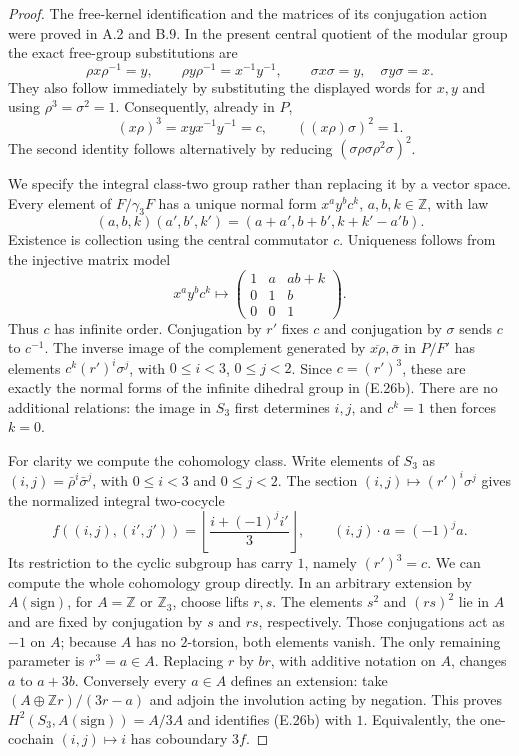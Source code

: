 \begin{proof}
The free-kernel identification and the matrices of its conjugation
action were proved in A.2 and B.9. In the present central quotient
of the modular group the exact free-group substitutions are
\[
 \rho x\rho^{-1}=y,\qquad
 \rho y\rho^{-1}=x^{-1}y^{-1},\qquad
 \sigma x\sigma=y,\quad\sigma y\sigma=x.                      \tag{E.26e}
\]
They also follow immediately by substituting the displayed words
for $x,y$ and using $\rho^3=\sigma^2=1$.
Consequently, already in $P$,
\[
 (x\rho)^3=xyx^{-1}y^{-1}=c,
 \qquad ((x\rho)\sigma)^2=1.                                 \tag{E.26f}
\]
The second identity follows alternatively by reducing
$(\sigma\rho\sigma\rho^2\sigma)^2$.

We specify the integral class-two group rather than replacing it
by a vector space. Every element of $F/\gamma_3F$ has a unique
normal form $x^a y^b c^k$, $a,b,k\in\mathbb Z$, with law
\[
 (a,b,k)(a',b',k')
   =(a+a',b+b',k+k'-a'b).                                    \tag{E.26g}
\]
Existence is collection using the central commutator $c$.
Uniqueness follows from the injective matrix model
\[
 x^a y^b c^k\longmapsto
 \begin{pmatrix}1&a&ab+k\\0&1&b\\0&0&1\end{pmatrix}.
\]
Thus $c$ has infinite order. Conjugation by $r'$ fixes $c$ and
conjugation by $\sigma$ sends $c$ to $c^{-1}$. The inverse image
of the complement generated by $\overline{x\rho},\bar\sigma$
in $P/F'$ has elements $c^k(r')^i\sigma^j$, with
$0\le i<3$, $0\le j<2$. Since $c=(r')^3$, these are exactly
the normal forms of the infinite dihedral group in (E.26b).
There are no additional relations: the image in $S_3$ first
determines $i,j$, and $c^k=1$ then forces $k=0$.

For clarity we compute the cohomology class. Write elements of
$S_3$ as $(i,j)=\bar\rho^i\bar\sigma^j$, with $0\le i<3$ and
$0\le j<2$. The section $(i,j)\mapsto(r')^i\sigma^j$ gives the
normalized integral two-cocycle
\[
 f((i,j),(i',j'))
   =\left\lfloor\frac{i+(-1)^j i'}{3}\right\rfloor,
 \qquad (i,j)\cdot a=(-1)^j a.                               \tag{E.26h}
\]
Its restriction to the cyclic subgroup has carry $1$, namely
$(r')^3=c$. We can compute the whole cohomology group directly.
In an arbitrary extension by $A(\mathrm{sign})$, for
$A=\mathbb Z$ or $\mathbb Z_3$, choose lifts $r,s$. The elements
$s^2$ and $(rs)^2$ lie in $A$ and are fixed by conjugation by
$s$ and $rs$, respectively. Those conjugations act as $-1$ on
$A$; because $A$ has no $2$-torsion, both elements vanish.
The only remaining parameter is $r^3=a\in A$. Replacing $r$
by $b r$, with additive notation on $A$, changes $a$ to $a+3b$.
Conversely every $a\in A$ defines an extension: take
$(A\oplus\mathbb Zr)/(3r-a)$ and adjoin the involution acting
by negation. This proves $H^2(S_3,A(\mathrm{sign}))=A/3A$ and
identifies (E.26b) with $1$. Equivalently,
the one-cochain $(i,j)\mapsto i$ has coboundary $3f$.


\end{proof}
